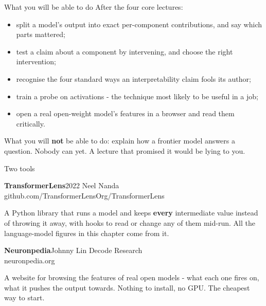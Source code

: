\documentclass[aspectratio=169]{beamer}
\newcommand{\trapbox}[1]{%
  \begin{tcolorbox}[colback=armred!8, colframe=armred, boxrule=0.6pt, arc=2pt]
  #1
  \end{tcolorbox}}
\newcommand{\toolcard}[3]{%
  \begin{tcolorbox}[colback=lightbg, colframe=popblue, boxrule=0.6pt, arc=2pt]
    {\large\bfseries\color{popblue} #1}\hfill{\small #2}\\[0.2em]
    {\small\ttfamily #3}
  \end{tcolorbox}}
\begin{document}
\begin{frame}{What you will be able to do}
  \vspace{0.5em}
  After the four core lectures:

  \vspace{0.5em}
  \begin{itemize}
    \item split a model's output into exact per-component contributions, and say which parts
      mattered;
    \item test a claim about a component by intervening, and choose the right intervention;
    \item recognise the four standard ways an interpretability claim fools its author;
    \item train a probe on activations - the technique most likely to be useful in a job;
    \item open a real open-weight model's features in a browser and read them critically.
  \end{itemize}

  \vspace{0.8em}
  \trapbox{\small What you will \textbf{not} be able to do: explain how a frontier model answers a
  question. Nobody can yet. A lecture that promised it would be lying to you.}
\end{frame}

\begin{frame}{Two tools}
  \vspace{0.6em}
  \toolcard{TransformerLens}{2022 \textperiodcentered{} Neel Nanda}{github.com/TransformerLensOrg/TransformerLens}

  \vspace{0.2em}
  {\small A Python library that runs a model and keeps \textbf{every} intermediate value instead of
  throwing it away, with hooks to read or change any of them mid-run. All the language-model
  figures in this chapter come from it.}

  \vspace{0.9em}
  \toolcard{Neuronpedia}{Johnny Lin \textperiodcentered{} Decode Research}{neuronpedia.org}

  \vspace{0.2em}
  {\small A website for browsing the features of real open models - what each one fires on, what it
  pushes the output towards. Nothing to install, no GPU. The cheapest way to start.}
\end{frame}
\end{document}
